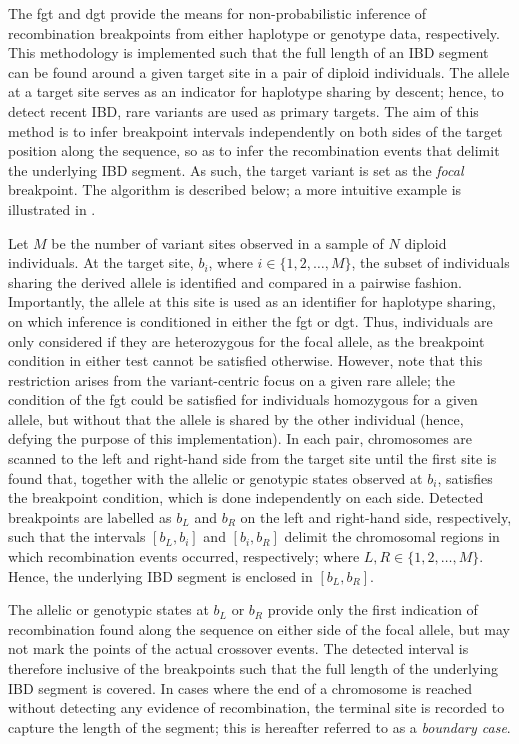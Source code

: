 The \gls{fgt} and \gls{dgt} provide the means for non-probabilistic inference of recombination breakpoints from either haplotype or genotype data, respectively.
This methodology is implemented such that the full length of an IBD segment can be found around a given target site in a pair of diploid individuals.
The allele at a target site serves as an indicator for haplotype sharing by descent; hence, to detect recent IBD, rare variants are used as primary targets.
The aim of this method is to infer breakpoint intervals independently on both sides of the target position along the sequence, so as to infer the  recombination events that delimit the underlying IBD segment.
As such, the target variant is set as the \emph{focal} breakpoint.
The algorithm is described below; a more intuitive example is illustrated in .

%

%

Let $M$ be the number of variant sites observed in a sample of $N$ diploid individuals.
At the target site, $b_{i}$, where ${i \in \lbrace 1, 2, \ldots, M \rbrace}$, the subset of individuals sharing the derived allele is identified and compared in a pairwise fashion.
Importantly, the allele at this site is used as an identifier for haplotype sharing, on which inference is conditioned in either the \gls{fgt} or \gls{dgt}.
Thus, individuals are only considered if they are heterozygous for the focal allele, as the breakpoint condition in either test cannot be satisfied otherwise.
However, note that this restriction arises from the variant-centric focus on a given rare allele; \eg the condition of the \gls{fgt} could be satisfied for individuals homozygous for a given allele, but without that the allele is shared by the other individual (hence, defying the purpose of this implementation).
In each pair, chromosomes are scanned to the left and right-hand side from the target site until the first site is found that, together with the allelic or genotypic states observed at $b_{i}$, satisfies the breakpoint condition, which is done independently on each side.
Detected breakpoints are labelled as $b_{L}$ and $b_{R}$ on the left and right-hand side, respectively, such that the intervals ${[b_{L}, b_{i}]}$ and ${[b_{i}, b_{R}]}$ delimit the chromosomal regions in which recombination events occurred, respectively; where ${L,R \in \lbrace 1, 2, \ldots, M \rbrace}$.
Hence, the underlying IBD segment is enclosed in ${[b_{L}, b_{R}]}$.

The allelic or genotypic states at $b_{L}$ or $b_{R}$ provide only the first indication of recombination found along the sequence on either side of the focal allele, but may not mark the points of the actual crossover events.
The detected interval is therefore inclusive of the breakpoints such that the full length of the underlying IBD segment is covered.
In cases where the end of a chromosome is reached without detecting any evidence of recombination, the terminal site is recorded to capture the length of the segment; this is hereafter referred to as a \emph{boundary case}.


